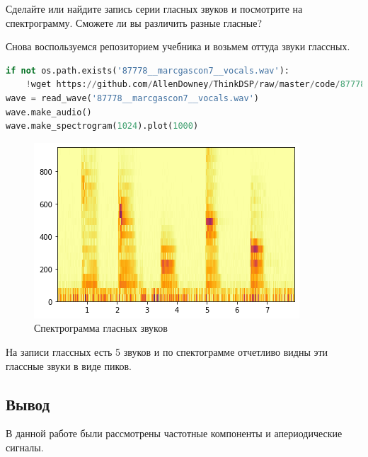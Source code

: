 Сделайте или найдите запись серии гласных звуков и посмотрите на спектрограмму. Сможете ли вы различить разные гласные?

Снова воспользуемся репозиторием учебника и возьмем оттуда звуки глассных.

\begin{lstlisting}[language=Python]
if not os.path.exists('87778__marcgascon7__vocals.wav'):
    !wget https://github.com/AllenDowney/ThinkDSP/raw/master/code/87778__marcgascon7__vocals.wav
wave = read_wave('87778__marcgascon7__vocals.wav')
wave.make_audio()
wave.make_spectrogram(1024).plot(1000)
\end{lstlisting}
\begin{figure}[H]
	\begin{center}
		\includegraphics[scale=1]{fig/lab03/lab03_10.png}
		\caption{Спектрограмма гласных звуков}
	\end{center}
\end{figure}

На записи глассных есть 5 звуков и по спектограмме отчетливо видны эти глассные звуки в виде пиков.

\subsection{Вывод}

В данной работе были рассмотрены частотные компоненты и апериодические сигналы.

